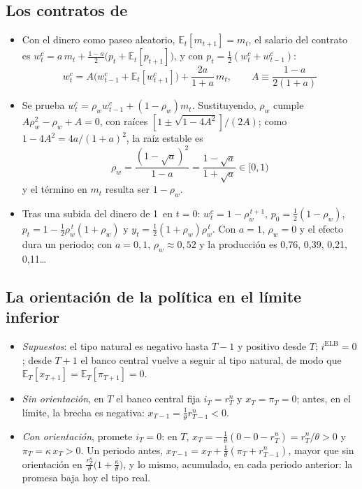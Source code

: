 \documentclass[11pt]{article}
\begin{document}
\subsection*{Los contratos de }
\begin{itemize}
\item Con el dinero como paseo aleatorio, $\mathbb{E}_t[m_{t+1}]=m_t$, el salario del contrato es $w^c_t=a\,m_t+\tfrac{1-a}{2}\big(p_t+\mathbb{E}_t[p_{t+1}]\big)$, y con $p_t=\tfrac12(w^c_t+w^c_{t-1})$:
  \[w^c_t=A\big(w^c_{t-1}+\mathbb{E}_t[w^c_{t+1}]\big)+\frac{2a}{1+a}\,m_t,\qquad A\equiv\frac{1-a}{2(1+a)}\]
\item Se prueba $w^c_t=\rho_w w^c_{t-1}+(1-\rho_w)m_t$. Sustituyendo, $\rho_w$ cumple $A\rho_w^2-\rho_w+A=0$, con raíces $[1\pm\sqrt{1-4A^2}]/(2A)$; como $1-4A^2=4a/(1+a)^2$, la raíz estable es
  \[\rho_w=\frac{(1-\sqrt a)^2}{1-a}=\frac{1-\sqrt a}{1+\sqrt a}\in[0,1)\]
  y el término en $m_t$ resulta ser $1-\rho_w$.
\item Tras una subida del dinero de 1~en $t=0$: $w^c_t=1-\rho_w^{\,t+1}$, $p_0=\tfrac12(1-\rho_w)$, $p_t=1-\tfrac12\rho_w^{\,t}(1+\rho_w)$ y $y_t=\tfrac12(1+\rho_w)\rho_w^{\,t}$. Con $a=1$, $\rho_w=0$ y el efecto dura un periodo; con $a=0{,}1$, $\rho_w\approx0{,}52$ y la producción es 0,76, 0,39, 0,21, 0,11\dots\ \findemo
\end{itemize}

\subsection*{La orientación de la política en el límite inferior}
\begin{itemize}
\item \emph{Supuestos}: el tipo natural es negativo hasta $T-1$ y positivo desde $T$; $i^{\mathrm{ELB}}=0$; desde $T+1$ el banco central vuelve a seguir al tipo natural, de modo que $\mathbb{E}_T[x_{T+1}]=\mathbb{E}_T[\pi_{T+1}]=0$.
\item \emph{Sin orientación}, en $T$ el banco central fija $i_T=r^n_T$ y $x_T=\pi_T=0$; antes, en el límite, la brecha es negativa: $x_{T-1}=\frac1\theta r^n_{T-1}<0$.
\item \emph{Con orientación}, promete $i_T=0$: en $T$, $x_T=-\frac1\theta(0-0-r^n_T)=r^n_T/\theta>0$ y $\pi_T=\kappa\,x_T>0$. Un periodo antes, $x_{T-1}=x_T+\frac1\theta(\pi_T+r^n_{T-1})$, mayor que sin orientación en $\frac{r^n_T}{\theta}\big(1+\frac{\kappa}{\theta}\big)$, y lo mismo, acumulado, en cada periodo anterior: la promesa baja hoy el tipo real\nocite{EggertssonWoodford2003Zero}. \findemo
\end{itemize}
\end{document}
